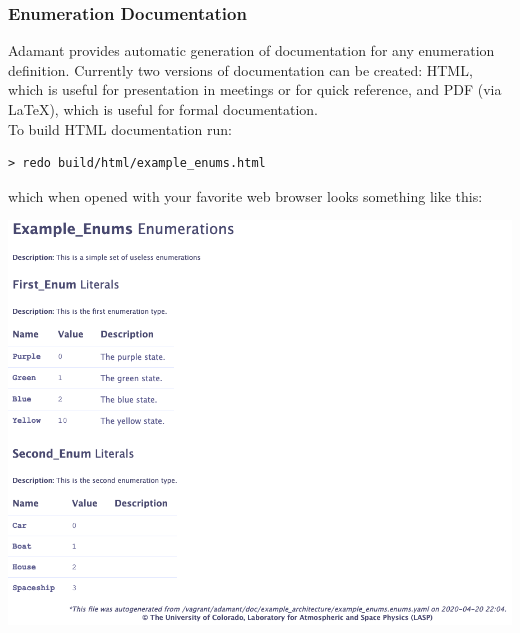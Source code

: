 \vspace{5mm} %
\inputminted{text}{../example_architecture/enum_assertion/output.txt}
\vspace{5mm} %

\subsubsection{Enumeration Documentation}

Adamant provides automatic generation of documentation for any enumeration definition. Currently two versions of documentation can be created: HTML, which is useful for presentation in meetings or for quick reference, and PDF (via \LaTeX), which is useful for formal documentation.\\

To build HTML documentation run:

\vspace{5mm} %
\begin{verbatim}
> redo build/html/example_enums.html
\end{verbatim}
\vspace{5mm} %

which when opened with your favorite web browser looks something like this:

\vspace{5mm} %
\includegraphics[width=\textwidth]{images/enumshtml.png}
\vspace{5mm} %

